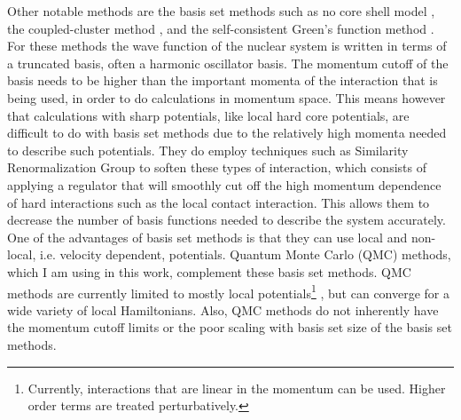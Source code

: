 Other notable methods are the basis set methods such as no core shell model \cite{navratil2009,barrett2013}, the coupled-cluster method \cite{hagen2014}, and the self-consistent Green's function method \cite{dickhoff2004,soma2014}. For these methods the wave function of the nuclear system is written in terms of a truncated basis, often a harmonic oscillator basis. The momentum cutoff of the basis needs to be higher than the important momenta of the interaction that is being used, in order to do calculations in momentum space. This means however that calculations with sharp potentials, like local hard core potentials, are difficult to do with basis set methods due to the relatively high momenta needed to describe such potentials. They do employ techniques such as Similarity Renormalization Group \cite{hergert2016} to soften these types of interaction, which consists of applying a regulator that will smoothly cut off the high momentum dependence of hard interactions such as the local contact interaction. This allows them to decrease the number of basis functions needed to describe the system accurately. One of the advantages of basis set methods is that they can use local and non-local, i.e. velocity dependent, potentials. Quantum Monte Carlo (QMC) methods, which I am using in this work, complement these basis set methods. QMC methods are currently limited to mostly local potentials\footnote{Currently, interactions that are linear in the momentum can be used. Higher order terms are treated perturbatively.} \cite{lynn2012}, but can converge for a wide variety of local Hamiltonians. Also, QMC methods do not inherently have the momentum cutoff limits or the poor scaling with basis set size of the basis set methods.

